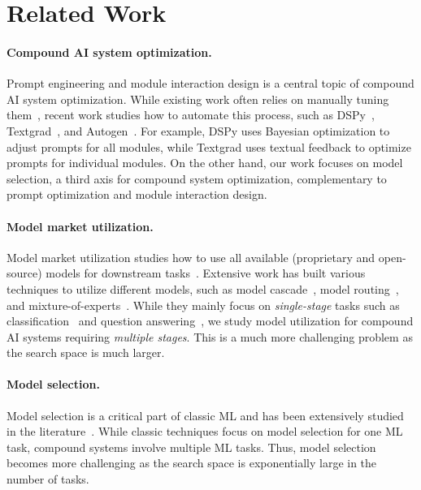\section{Related Work}
\label{sec:deluxeagent:Relatedwork}

\paragraph{Compound AI system optimization.} Prompt engineering and module interaction design is a central topic of compound AI system optimization. While existing work often relies on manually tuning them~\cite{deepmind2025alphacode2,shinn2024reflexion,zhou2024agents2,pryzant2023automatic,fourney2024magentic,zhao2024expel,lu2024chameleon,zhao2024expel}, recent work studies how to automate this process, such as DSPy~\cite{khattab2024dspy}, Textgrad~\cite{yuksekgonul2024textgrad}, and Autogen~\cite{wu2023autogen}. For example, DSPy uses Bayesian optimization to adjust prompts for all modules, while Textgrad uses textual feedback to optimize prompts for individual modules. On the other hand, our work focuses on model selection, a third axis for compound system optimization, complementary to prompt optimization and module interaction design. 

\paragraph{Model market utilization.} Model market utilization studies how to use all available (proprietary and open-source) models for downstream tasks~\cite{lu2024merge,ramirez2024optimising,miao2023towards}. Extensive work has built various techniques to utilize different models, such as model cascade~\cite{chen2023frugalgpt}, model routing~\cite{hu2024routerbench,stripelis2024tensoropera}, and mixture-of-experts~\cite{wang2024mixture}. While they mainly focus on  \textit{single-stage} tasks such as classification~\cite{chen2020frugalml,huang2025thriftllm} and question answering~\cite{chen2023frugalgpt,shekhar2024towards}, we study model utilization for compound AI systems requiring \textit{multiple stages}. This is a much more challenging problem as the search space is much larger. 

\paragraph{Model selection.} Model selection is a critical part of classic ML and has been extensively studied in the literature~\cite{kohavi1995study,akaike1974new,elsken2019neural}. %
While classic techniques focus on model selection for one ML task, compound systems involve multiple ML tasks. Thus, model selection becomes more challenging as the search space is exponentially large in the number of tasks.  

